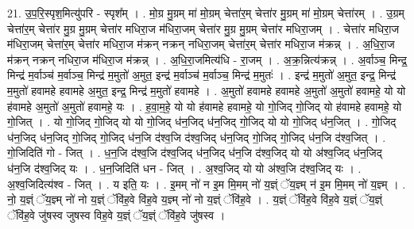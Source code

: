 \documentclass[17pt]{extarticle}
\begin{document}
21. उ॒प॒रि॒स्पृश॒मित्यु॑परि - स्पृश᳚म् । . मो॒ग्र मु॒ग्रम् मा॑ मो॒ग्रम् चेत्ता॑र॒म् चेत्ता॑र मु॒ग्रम् मा॑ मो॒ग्रम् चेत्ता॑रम् । . उ॒ग्रम् चेत्ता॑र॒म् चेत्ता॑र मु॒ग्र मु॒ग्रम् चेत्ता॑र मधिरा॒ज म॑धिरा॒जम् चेत्ता॑र मु॒ग्र मु॒ग्रम् चेत्ता॑र मधिरा॒जम् । . चेत्ता॑र मधिरा॒ज म॑धिरा॒जम् चेत्ता॑र॒म् चेत्ता॑र मधिरा॒ज म॑क्रन् नक्रन् नधिरा॒जम् चेत्ता॑र॒म् चेत्ता॑र मधिरा॒ज म॑क्रन्न् । . अ॒धि॒रा॒ज म॑क्रन् नक्रन् नधिरा॒ज म॑धिरा॒ज म॑क्रन्न् । . अ॒धि॒रा॒जमित्य॑धि - रा॒जम् । . अ॒क्र॒न्नित्य॑क्रन्न् । . अ॒र्वाञ्च॒ मिन्द्र॒ मिन्द्र॑ म॒र्वाञ्च॑ म॒र्वाञ्च॒ मिन्द्र॑ म॒मुतो॑ अ॒मुत॒ इन्द्र॑ म॒र्वाञ्च॑ म॒र्वाञ्च॒ मिन्द्र॑ म॒मुतः॑ । . इन्द्र॑ म॒मुतो॑ अ॒मुत॒ इन्द्र॒ मिन्द्र॑ म॒मुतो॑ हवामहे हवामहे अ॒मुत॒ इन्द्र॒ मिन्द्र॑ म॒मुतो॑ हवामहे । . अ॒मुतो॑ हवामहे हवामहे अ॒मुतो॑ अ॒मुतो॑ हवामहे॒ यो यो ह॑वामहे अ॒मुतो॑ अ॒मुतो॑ हवामहे॒ यः । . ह॒वा॒म॒हे॒ यो यो ह॑वामहे हवामहे॒ यो गो॒जिद् गो॒जिद् यो ह॑वामहे हवामहे॒ यो गो॒जित् । . यो गो॒जिद् गो॒जिद् यो यो गो॒जिद् ध॑न॒जिद् ध॑न॒जिद् गो॒जिद् यो यो गो॒जिद् ध॑न॒जित् । . गो॒जिद् ध॑न॒जिद् ध॑न॒जिद् गो॒जिद् गो॒जिद् ध॑न॒जि द॑श्व॒जि द॑श्व॒जिद् ध॑न॒जिद् गो॒जिद् गो॒जिद् ध॑न॒जि द॑श्व॒जित् । . गो॒जिदिति॑ गो - जित् । . ध॒न॒जि द॑श्व॒जि द॑श्व॒जिद् ध॑न॒जिद् ध॑न॒जि द॑श्व॒जिद् यो यो अ॑श्व॒जिद् ध॑न॒जिद् ध॑न॒जि द॑श्व॒जिद् यः । . ध॒न॒जिदिति॑ धन - जित् । . अ॒श्व॒जिद् यो यो अ॑श्व॒जि द॑श्व॒जिद् यः । . अ॒श्व॒जिदित्य॑श्व - जित् । . य इति॒ यः । . इ॒मम् नो॑ न इ॒म मि॒मम् नो॑ य॒ज्ञ्ं ॅय॒ज्ञ्म् न॑ इ॒म मि॒मम् नो॑ य॒ज्ञ्म् । . नो॒ य॒ज्ञ्ं ॅय॒ज्ञ्म् नो॑ नो य॒ज्ञ्ं ॅवि॑ह॒वे वि॑ह॒वे य॒ज्ञ्म् नो॑ नो य॒ज्ञ्ं ॅवि॑ह॒वे । . य॒ज्ञ्ं ॅवि॑ह॒वे वि॑ह॒वे य॒ज्ञ्ं ॅय॒ज्ञ्ं ॅवि॑ह॒वे जु॑षस्व जुषस्व विह॒वे य॒ज्ञ्ं ॅय॒ज्ञ्ं ॅवि॑ह॒वे जु॑षस्व । \newline
\end{document}
